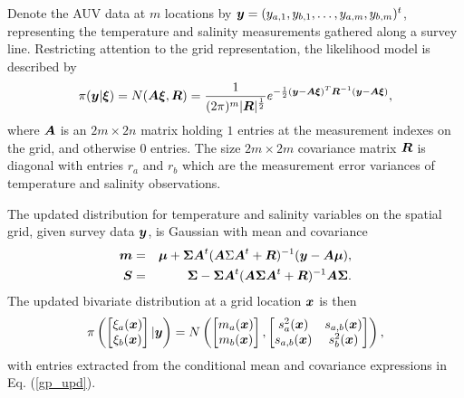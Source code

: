 \documentclass[aoas]{imsart}
\begin{document}
Denote the AUV data at $m$ locations by ${\boldsymbol y}=(y_{a,1},y_{b,1},\ldots,y_{a,m},y_{b,m})^t$, representing the temperature and salinity measurements gathered along a survey line.
Restricting attention to the grid representation, the likelihood model is described by 
\begin{equation}\label{likelihood}
\pi(\by | \bxi)=N(\bA \bxi,\bR)= \frac{1}{(2\pi)^{m}|\bR|^{\frac{1}{2}}}e^{-\frac{1}{2}(\by -\bA\bxi)^T\bR^{-1}(\by-\bA\bxi)},
\end{equation}
where ${\boldsymbol A}$ is an $2m \times 2n$ matrix holding $1$ entries at the measurement indexes on the grid, and otherwise $0$ entries. The size $2m \times 2m$ covariance matrix ${\boldsymbol R}$ is diagonal with entries $r_a$ and $r_b$ which are the measurement error variances of temperature and salinity observations. 

The updated distribution for temperature and salinity variables on the spatial grid, given survey data ${\boldsymbol y}$, is Gaussian with mean and covariance
\begin{eqnarray}\label{gp_upd}
\bm &=& \bmu+\bSigma \bA^t (\bA \Sigma \bA^t+\bR)^{-1}(\by-\bA \bmu),  \\
\bS &=& \bSigma - \bSigma \bA^t (\bA \bSigma \bA^t+\bR)^{-1} \bA \bSigma.\nonumber
\end{eqnarray}
The updated bivariate distribution at a grid location ${\boldsymbol x}$ is then 
\begin{equation}\label{gp_hat}
\pi 
\left(
\begin{bmatrix}
\xi_a(\bx) \\
\xi_b(\bx)
\end{bmatrix}
 |\by
 \right)
 = N \left( 
\begin{bmatrix} m_{a}(\bx)\\
m_{b}(\bx)
\end{bmatrix},\begin{bmatrix}
s_{a}^2(\bx) & s_{a,b}(\bx)  \\
s_{a,b}(\bx)  & s_{b}^2(\bx)  
\end{bmatrix}
\right),
\end{equation}
with entries extracted from the conditional mean and covariance expressions in Eq. (\ref{gp_upd}).
\end{document}
